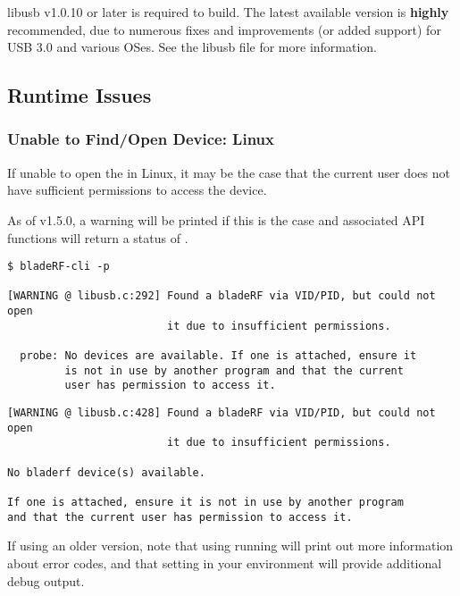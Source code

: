 libusb v1.0.10 or later is required to build. The latest available version is
\textbf{highly} recommended, due to numerous fixes and improvements (or added
support) for USB 3.0 and various OSes. See the libusb  file
\cite{LIBUSB_CHANGELOG} for more information.

\subsection{Runtime Issues}

\subsubsection{Unable to Find/Open Device: Linux}\label{sec:open-linux}

If unable to open the \bladerf in Linux, it may be the case that the current
user does not have sufficient permissions to access the device.

As of \libbladerf v1.5.0, a warning will be printed if this is the case and
associated API functions will return a status of .

\begin{lstlisting}[style=numbered-snippet, caption=Insufficient permissions to probe device]
$ bladeRF-cli -p

[WARNING @ libusb.c:292] Found a bladeRF via VID/PID, but could not open
                         it due to insufficient permissions.

  probe: No devices are available. If one is attached, ensure it
         is not in use by another program and that the current
         user has permission to access it.

\end{lstlisting}

\begin{lstlisting}[style=numbered-snippet, caption=Insufficient permissions to open device]
[WARNING @ libusb.c:428] Found a bladeRF via VID/PID, but could not open
                         it due to insufficient permissions.

No bladerf device(s) available.

If one is attached, ensure it is not in use by another program
and that the current user has permission to access it.
\end{lstlisting}

If using an older version, note that using running
 will print out more information about error codes,
and that setting  in your environment will
provide additional debug output.

